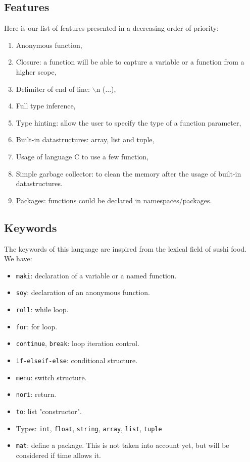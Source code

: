 \documentclass[a4paper,titlepage]{article}
\begin{document}
  \subsection{Features}
Here is our list of features presented in a decreasing order of priority:
\begin{enumerate}
  \item Anonymous function,
  \item Closure: a function will be able to capture a variable or a function from a higher scope,
  \item Delimiter of end of line: $\backslash$n (...),
  \item Full type inference,
  \item Type hinting: allow the user to specify the type of a function parameter,
  \item Built-in datastructures: array, list and tuple,
  \item Usage of language C to use a few function,
  \item Simple garbage collector: to clean the memory after the usage of built-in datastructures.
  \item Packages: functions could be declared in namespaces/packages.
\end{enumerate}


  \subsection{Keywords}

The keywords of this language are inspired from the lexical field of sushi food. We have:
\begin{itemize}
  \item \texttt{maki}: declaration of a variable or a named function.
  \item \texttt{soy}: declaration of an anonymous function.
  \item \texttt{roll}: while loop.
  \item \texttt{for}: for loop.
  \item \texttt{continue}, \texttt{break}: loop iteration control. 
  \item \texttt{if-elseif-else}: conditional structure.
  \item \texttt{menu}: switch structure.
  \item \texttt{nori}: return.
  \item \texttt{to}: list "constructor". 
  \item Types: \texttt{int}, \texttt{float}, \texttt{string}, \texttt{array}, \texttt{list}, \texttt{tuple}
  \item \texttt{mat}: define a package. This is not taken into account yet, but will be considered if time allows it.
\end{itemize}
\end{document}
